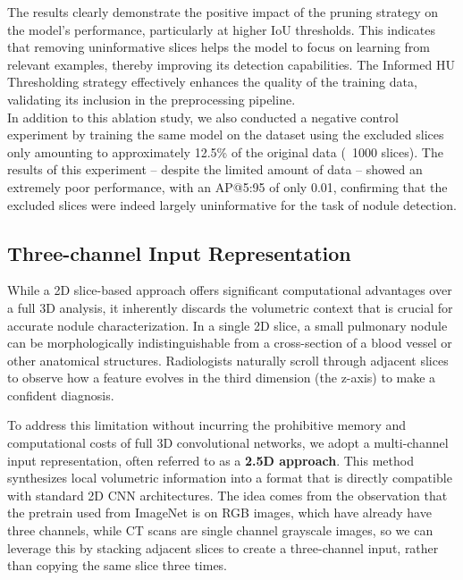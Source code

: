 

The results clearly demonstrate the positive impact of the pruning strategy on the model's performance, particularly at higher IoU thresholds. This indicates that removing uninformative slices helps the model to focus on learning from relevant examples, thereby improving its detection capabilities. The Informed HU Thresholding strategy effectively enhances the quality of the training data, validating its inclusion in the preprocessing pipeline.\\

In addition to this ablation study, we also conducted a negative control experiment by training the same model on the dataset using the excluded slices only amounting to approximately 12.5\% of the original data (~1000 slices). The results of this experiment -- despite the limited amount of data -- showed an extremely poor performance, with an AP@5:95 of only 0.01, confirming that the excluded slices were indeed largely uninformative for the task of nodule detection.



\subsection{Three-channel Input Representation}
\label{sec:2.5d_approach}

While a 2D slice-based approach offers significant computational advantages over a full 3D analysis, it inherently discards the volumetric context that is crucial for accurate nodule characterization. In a single 2D slice, a small pulmonary nodule can be morphologically indistinguishable from a cross-section of a blood vessel or other anatomical structures. Radiologists naturally scroll through adjacent slices to observe how a feature evolves in the third dimension (the z-axis) to make a confident diagnosis.

To address this limitation without incurring the prohibitive memory and computational costs of full 3D convolutional networks, we adopt a multi-channel input representation, often referred to as a \textbf{2.5D approach}. This method synthesizes local volumetric information into a format that is directly compatible with standard 2D CNN architectures.
The idea comes from the observation that the pretrain used from ImageNet is on RGB images, which have already have three channels, while CT scans are single channel grayscale images, so we can leverage this by stacking adjacent slices to create a three-channel input, rather than copying the same slice three times.

